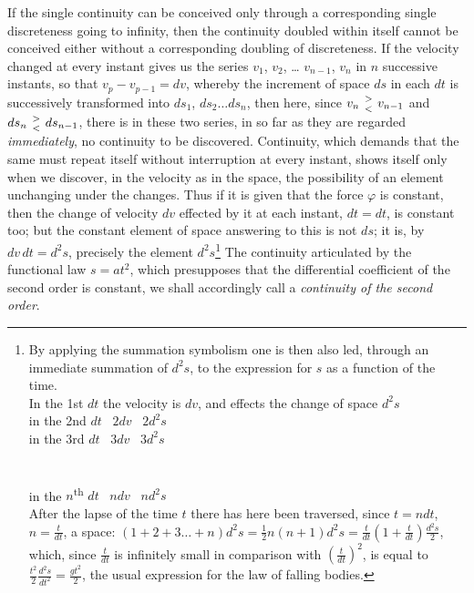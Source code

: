 \documentclass[12pt,a4paper]{book}
\begin{document}
If the single continuity can be conceived only through a corresponding single
discreteness going to infinity, then the continuity doubled within itself
cannot be conceived either without a corresponding doubling of discreteness. If
the velocity changed at every instant gives us the series $v_1$, $v_2$, \ldots
\setcounter{footnote}{0}
$v_{n-1}$, $v_n$ in $n$ successive instants, so that
$v_p - v_{p-1} = dv$, whereby the increment of space $ds$ in each $dt$
is successively transformed into $ds_1$, $ds_2 \ldots ds_n$, then here,
since $v_n \mathrel{{>}\atop{<}} v_{n-1}$ and
$ds_n \mathrel{{>}\atop{<}} ds_{n-1}$, there is in these two series,
in so far as they are regarded \emph{immediately}, no continuity to be
discovered. Continuity, which demands that the same must repeat itself without
interruption at every instant, shows itself only when we discover, in the
velocity as in the space, the possibility of an element unchanging under the
changes. Thus if it is given that the force $\varphi$ is constant, then the
change of velocity $dv$ effected by it at each instant, $dt = dt$, is
constant too; but the constant element of space answering to this is
not $ds$; it is, by $dv\,dt = d^2s$, precisely the element
$d^2s$\footnote{By applying the summation symbolism one is then also led,
through an immediate summation of $d^2s$, to the expression
for $s$ as a function of the time.\\
In the 1st $dt$ the velocity is $dv$, and effects the change of space $d^2s$\\
in the 2nd $dt$ \dotfill\ $2dv$ \dotfill\ $2d^2s$\\
in the 3rd $dt$ \dotfill\ $3dv$ \dotfill\ $3d^2s$\\
\leavevmode\dotfill\\
\leavevmode\dotfill\\
in the $n$\textsuperscript{th} $dt$ \dotfill\ $ndv$ \dotfill\ $nd^2s$\\
After the lapse of the time $t$ there has here been traversed, since
$t = ndt$, $n = \frac{t}{dt}$, a space:
$(1 + 2 + 3 \ldots + n)d^2s = \frac{1}{2}n(n+1)d^2s
= \frac{t}{dt}\left(1 + \frac{t}{dt}\right)\frac{d^2s}{2}$,
which, since $\frac{t}{dt}$ is infinitely small in comparison with
$\left(\frac{t}{dt}\right)^2$, is equal to
$\frac{t^2}{2}\frac{d^2s}{dt^2} = \frac{gt^2}{2}$, the
usual expression for the law of falling bodies.} The continuity articulated by
the functional law $s = at^2$, which presupposes that the differential
coefficient of the second order is constant, we shall accordingly call a
\emph{continuity of the second order}.
\setcounter{footnote}{0}
\end{document}
